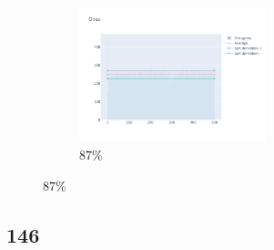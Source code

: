 \documentclass[12pt, fleqn]{report}                             %
\theoremstyle{break}                                            %
\begin{document}
\begin{figure}[ht!]
\begin{subfigure}[b]{0.4\linewidth}
          \includegraphics[width=0.6\textwidth]{Images/126/dia-d.png}
          \caption{87\%}
        \end{subfigure}
      \end{figure}


      \clearpage
      \subsection{146}
\end{document}

